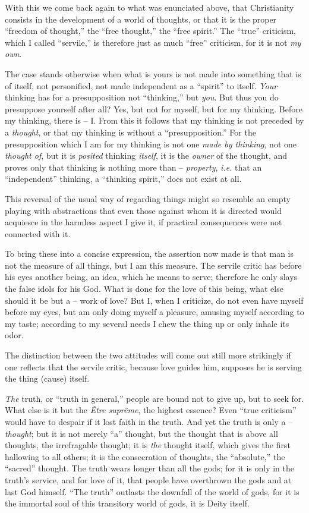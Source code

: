 \documentclass[12pt,a4paper]{book}
\begin{document}
With this we come back again to what was enunciated above, that Christianity 
consists in the development of a world of thoughts, or that it is the proper 
``freedom of thought,'' the ``free thought,'' the ``free spirit.'' The 
``true'' criticism, which I called ``servile,'' is therefore just as much 
``free'' criticism, for it is not \textit{my own}.

The case stands otherwise when what is yours is not made into something that 
is of itself, not personified, not made independent as a ``spirit'' to 
itself. \textit{Your} thinking has for a presupposition not ``thinking,'' 
but \textit{you}. But thus you do presuppose yourself after all? Yes, but not 
for myself, but for my thinking. Before my thinking, there is -- I. From this 
it follows that my thinking is not preceded by a \textit{thought}, or that my 
thinking is without a ``presupposition.'' For the presupposition which I am 
for my thinking is not one \textit{made by thinking}, not one \textit{thought 
of}, but it is \textit{posited} thinking \textit{itself}, it is the 
\textit{owner} of the thought, and proves only that thinking is nothing more 
than -- \textit{property}, \textit{i.e.} that an ``independent'' thinking, 
a ``thinking spirit,'' does not exist at all.

 This reversal of the usual way of regarding things might so resemble an empty 
playing with abstractions that even those against whom it is directed would 
acquiesce in the harmless aspect I give it, if practical consequences were not 
connected with it.

To bring these into a concise expression, the assertion now made is that man 
is not the measure of all things, but I am this measure. The servile critic 
has before his eyes another being, an idea, which he means to serve; therefore 
he only slays the false idols for his God. What is done for the love of this 
being, what else should it be but a -- work of love? But I, when I criticize, 
do not even have myself before my eyes, but am only doing myself a pleasure, 
amusing myself according to my taste; according to my several needs I chew the 
thing up or only inhale its odor.

The distinction between the two attitudes will come out still more strikingly 
if one reflects that the servile critic, because love guides him, supposes he 
is serving the thing (cause) itself.

\textit{The} truth, or ``truth in general,'' people are bound not to give 
up, but to seek for. What else is it but the \textit{\^Etre supr\^eme}, the 
highest essence? Even ``true criticism'' would have to despair if it lost 
faith in the truth. And yet the truth is only a -- \textit{thought}; but it is 
not merely ``a'' thought, but the thought that is above all thoughts, the 
irrefragable thought; it is \textit{the} thought itself, which gives the first 
hallowing to all others; it is the consecration of thoughts, the 
``absolute,'' the ``sacred'' thought. The truth wears longer than all the 
gods; for it is only in the truth's service, and for love of it, that people 
have overthrown the gods and at last God himself. ``The truth'' outlasts the 
downfall of the world of gods, for it is the immortal soul of this transitory 
world of gods, it is Deity itself.
\end{document}
